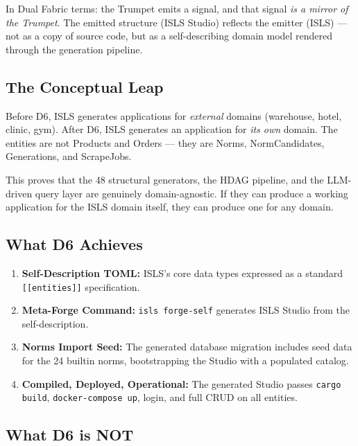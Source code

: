 \documentclass[11pt,a4paper]{article}
\begin{document}
In Dual Fabric terms: the Trumpet emits a signal, and that signal
\emph{is a mirror of the Trumpet}. The emitted structure (ISLS Studio)
reflects the emitter (ISLS) --- not as a copy of source code, but as a
self-describing domain model rendered through the generation pipeline.

\subsection{The Conceptual Leap}

Before D6, ISLS generates applications for \emph{external} domains
(warehouse, hotel, clinic, gym). After D6, ISLS generates an application
for \emph{its own} domain. The entities are not Products and Orders ---
they are Norms, NormCandidates, Generations, and ScrapeJobs.

This proves that the 48 structural generators, the HDAG pipeline, and
the LLM-driven query layer are genuinely domain-agnostic. If they can
produce a working application for the ISLS domain itself, they can
produce one for any domain.

\subsection{What D6 Achieves}

\begin{enumerate}[nosep]
\item \textbf{Self-Description TOML:} ISLS's core data types expressed
      as a standard \texttt{[[entities]]} specification.
\item \textbf{Meta-Forge Command:} \texttt{isls forge-self} generates
      ISLS Studio from the self-description.
\item \textbf{Norms Import Seed:} The generated database migration
      includes seed data for the 24 builtin norms, bootstrapping
      the Studio with a populated catalog.
\item \textbf{Compiled, Deployed, Operational:} The generated Studio
      passes \texttt{cargo build}, \texttt{docker-compose up}, login,
      and full CRUD on all entities.
\end{enumerate}

\subsection{What D6 is NOT}
\end{document}
